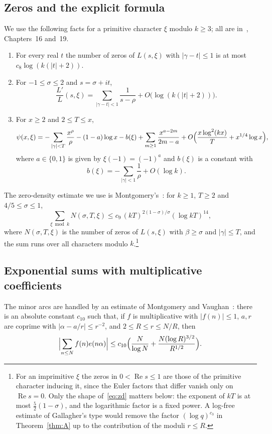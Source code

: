 \documentclass[11pt,a4paper,reqno]{amsart}
\theoremstyle{remark}
\numberwithin{equation}{section}
\renewcommand{\Re}{\operatorname{Re}}
\begin{document}
\subsection{Zeros and the explicit formula}
We use the following facts for a primitive character $\xi$ modulo $k\ge3$; all are in~\cite{Dav00}, Chapters~16 and~19.
\begin{enumerate}
\item[(Z1)] For every real $t$ the number of zeros of $L(s,\xi)$ with $|\gamma-t|\le1$ is at most $c_8\log(k(|t|+2))$.
\item[(Z2)] For $-1\le\sigma\le2$ and $s=\sigma+it$,
\[
  \frac{L'}{L}(s,\xi)=\sum_{|\gamma-t|<1}\frac1{s-\rho}+O\bigl(\log(k(|t|+2))\bigr).
\]
\item[(Z3)] For $x\ge2$ and $2\le T\le x$,
\[
  \psi(x,\xi)=-\sum_{|\gamma|<T}\frac{x^\rho}\rho-(1-a)\log x-b(\xi)+\sum_{m\ge1}\frac{x^{a-2m}}{2m-a}+O\Bigl(\frac{x\log^2(kx)}T+x^{1/4}\log x\Bigr),
\]
where $a\in\{0,1\}$ is given by $\xi(-1)=(-1)^a$ and $b(\xi)$ is a constant with
\[
  b(\xi)=-\sum_{|\gamma|<1}\frac1\rho+O(\log k).
\]
\end{enumerate}

The zero-density estimate we use is Montgomery's~\cite[Theorem~12.2]{Mon71}: for $k\ge1$, $T\ge2$ and $4/5\le\sigma\le1$,
\begin{equation}\label{eq:zd}
  \sum_{\xi\bmod k}N(\sigma,T,\xi)\le c_9\,(kT)^{2(1-\sigma)/\sigma}(\log kT)^{14},
\end{equation}
where $N(\sigma,T,\xi)$ is the number of zeros of $L(s,\xi)$ with $\beta\ge\sigma$ and $|\gamma|\le T$, and the sum runs over all characters modulo $k$.\footnote{For an imprimitive $\xi$ the zeros in $0<\Re s\le1$ are those of the primitive character inducing it, since the Euler factors that differ vanish only on $\Re s=0$. Only the shape of~\eqref{eq:zd} matters below: the exponent of $kT$ is at most $\frac52(1-\sigma)$, and the logarithmic factor is a fixed power. A log-free estimate of Gallagher's type would remove the factor $(\log q)^{c_3}$ in Theorem~\ref{thm:A} up to the contribution of the moduli $r\le R$.}

\subsection{Exponential sums with multiplicative coefficients}
The minor arcs are handled by an estimate of Montgomery and Vaughan~\cite[Corollary~1]{MV77}: there is an absolute constant $c_{10}$ such that, if $f$ is multiplicative with $|f(n)|\le1$, $a,r$ are coprime with $|\alpha-a/r|\le r^{-2}$, and $2\le R\le r\le N/R$, then
\begin{equation}\label{eq:mv}
  \Bigl|\sum_{n\le N}f(n)e(n\alpha)\Bigr|\le c_{10}\Bigl(\frac N{\log N}+\frac{N(\log R)^{3/2}}{R^{1/2}}\Bigr).
\end{equation}
\end{document}
